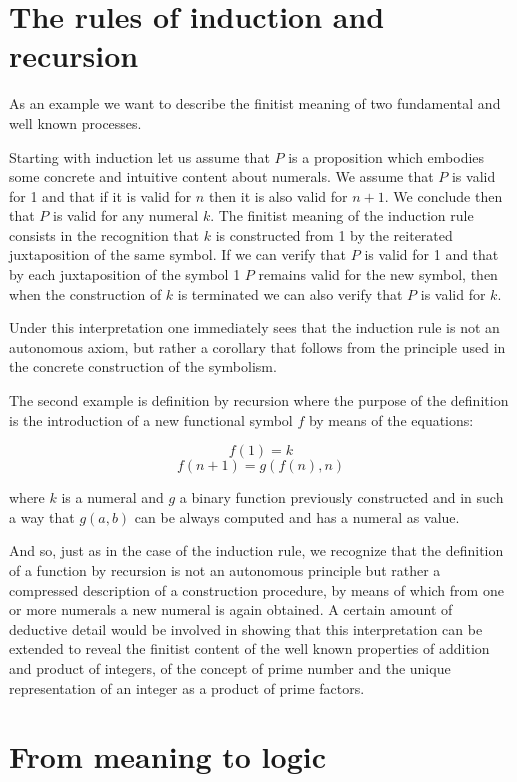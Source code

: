 \documentclass[12pt]{article}
\begin{document}
\section{The rules of induction and recursion}\normalsize

As an example we want to describe the finitist meaning of two fundamental and well known processes.

Starting with induction let us assume that $P$ is a proposition which embodies some concrete and intuitive content about numerals. We assume that $P$ is valid for 1 and that if it is valid for $n$ then it is also valid for $n + 1$. We conclude then that $P$ is valid for any numeral $k$. The finitist meaning of the induction rule consists in the recognition that $k$ is constructed from 1 by the reiterated juxtaposition of the same symbol. If we can verify that $P$ is valid for 1 and that by each juxtaposition of the symbol 1 $P$ remains valid for the new symbol,
then when the construction of $k$ is terminated we can also verify that $P$ is valid for $k$.

Under this interpretation one immediately sees that the induction rule is not an autonomous axiom, but rather a corollary that follows from the principle used in the concrete construction of the symbolism.

The second example is definition by recursion where the purpose of the definition is the introduction of a new  functional symbol $f$ by means of the equations:

$$f (1) = k$$
$$f (n + 1) = g (f (n), n)$$

where $k$ is a numeral and $g$ a binary function previously constructed and in such a way that $g (a ,b)$ can be always computed and has a numeral as value.

And so, just as in the case of the induction rule, we recognize that the definition of a function by recursion is not an autonomous principle but rather a compressed description of a construction procedure, by means of which from one or more numerals a new numeral is again obtained. A certain amount of deductive detail would be involved in showing that this interpretation can be extended to reveal the finitist content of the well known properties of addition and product of integers, of the concept of prime number and the unique representation of an integer as a product of prime factors.

\section{From meaning to logic}\normalsize
\end{document}
